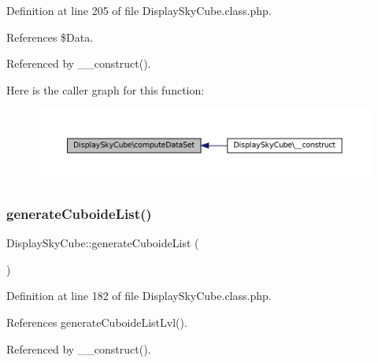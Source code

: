 Definition at line 205 of file Display\+Sky\+Cube.\+class.\+php.



References \$\+Data.



Referenced by \+\_\+\+\_\+construct().

Here is the caller graph for this function\+:\nopagebreak
\begin{figure}[H]
\begin{center}
\leavevmode
\includegraphics[width=350pt]{class_display_sky_cube_a0a64068061d9a2e499bb5cf58ebf51ce_icgraph}
\end{center}
\end{figure}
\mbox{\label{class_display_sky_cube_a55b3623b8575c66eea925663fa771f7a}} 
\subsubsection{\texorpdfstring{generate\+Cuboide\+List()}{generateCuboideList()}}
{\footnotesize\ttfamily Display\+Sky\+Cube\+::generate\+Cuboide\+List (\begin{DoxyParamCaption}{ }\end{DoxyParamCaption})\hspace{0.3cm}{\ttfamily [protected]}}



Definition at line 182 of file Display\+Sky\+Cube.\+class.\+php.



References generate\+Cuboide\+List\+Lvl().



Referenced by \+\_\+\+\_\+construct().

